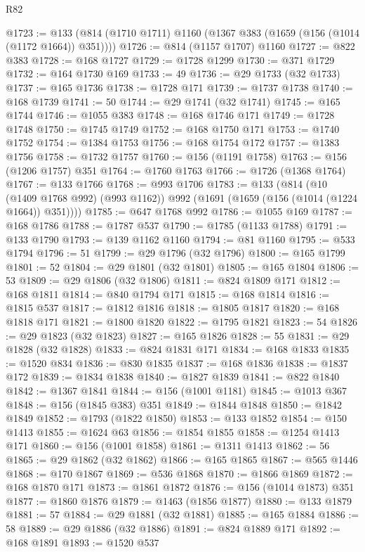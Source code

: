 \begin{lexlean}{R82}
\begin{coremodule}
@1723 := @133 (@814 (@1710 @1711) @1160 (@1367 @383 (@1659 (@156 (@1014 (@1172 @1664)) @351))))
@1726 := @814 (@1157 @1707) @1160
@1727 := @822 @383
@1728 := @168 @1727
@1729 := @1728 @1299
@1730 := @371 @1729
@1732 := @164 @1730 @169
@1733 := 49
@1736 := @29 @1733 (@32 @1733)
@1737 := @165 @1736
@1738 := @1728 @171
@1739 := @1737 @1738
@1740 := @168 @1739
@1741 := 50
@1744 := @29 @1741 (@32 @1741)
@1745 := @165 @1744
@1746 := @1055 @383
@1748 := @168 @1746 @171
@1749 := @1728 @1748
@1750 := @1745 @1749
@1752 := @168 @1750 @171
@1753 := @1740 @1752
@1754 := @1384 @1753
@1756 := @168 @1754 @172
@1757 := @1383 @1756
@1758 := @1732 @1757
@1760 := @156 (@1191 @1758)
@1763 := @156 (@1206 @1757) @351
@1764 := @1760 @1763
@1766 := @1726 (@1368 @1764)
@1767 := @133 @1766
@1768 := @993 @1706
@1783 := @133
    (@814
      (@10 (@1409 @1768 @992) (@993 @1162))
      @992
      (@1691 (@1659 (@156 (@1014 (@1224 @1664)) @351))))
@1785 := @647 @1768 @992
@1786 := @1055 @169
@1787 := @168 @1786
@1788 := @1787 @537
@1790 := @1785 (@1133 @1788)
@1791 := @133 @1790
@1793 := @139 @1162 @1160
@1794 := @81 @1160
@1795 := @533 @1794
@1796 := 51
@1799 := @29 @1796 (@32 @1796)
@1800 := @165 @1799
@1801 := 52
@1804 := @29 @1801 (@32 @1801)
@1805 := @165 @1804
@1806 := 53
@1809 := @29 @1806 (@32 @1806)
@1811 := @824 @1809 @171
@1812 := @168 @1811
@1814 := @840 @1794 @171
@1815 := @168 @1814
@1816 := @1815 @537
@1817 := @1812 @1816
@1818 := @1805 @1817
@1820 := @168 @1818 @171
@1821 := @1800 @1820
@1822 := @1795 @1821
@1823 := 54
@1826 := @29 @1823 (@32 @1823)
@1827 := @165 @1826
@1828 := 55
@1831 := @29 @1828 (@32 @1828)
@1833 := @824 @1831 @171
@1834 := @168 @1833
@1835 := @1520 @834
@1836 := @830 @1835
@1837 := @168 @1836
@1838 := @1837 @172
@1839 := @1834 @1838
@1840 := @1827 @1839
@1841 := @822 @1840
@1842 := @1367 @1841
@1844 := @156 (@1001 @1181)
@1845 := @1013 @367
@1848 := @156 (@1845 @383) @351
@1849 := @1844 @1848
@1850 := @1842 @1849
@1852 := @1793 (@1822 @1850)
@1853 := @133 @1852
@1854 := @150 @1413
@1855 := @1624 @63
@1856 := @1854 @1855
@1858 := @1254 @1413 @171
@1860 := @156 (@1001 @1858)
@1861 := @1311 @1413
@1862 := 56
@1865 := @29 @1862 (@32 @1862)
@1866 := @165 @1865
@1867 := @565 @1446
@1868 := @170 @1867
@1869 := @536 @1868
@1870 := @1866 @1869
@1872 := @168 @1870 @171
@1873 := @1861 @1872
@1876 := @156 (@1014 @1873) @351
@1877 := @1860 @1876
@1879 := @1463 (@1856 @1877)
@1880 := @133 @1879
@1881 := 57
@1884 := @29 @1881 (@32 @1881)
@1885 := @165 @1884
@1886 := 58
@1889 := @29 @1886 (@32 @1886)
@1891 := @824 @1889 @171
@1892 := @168 @1891
@1893 := @1520 @537

\end{coremodule}
\end{lexlean}

